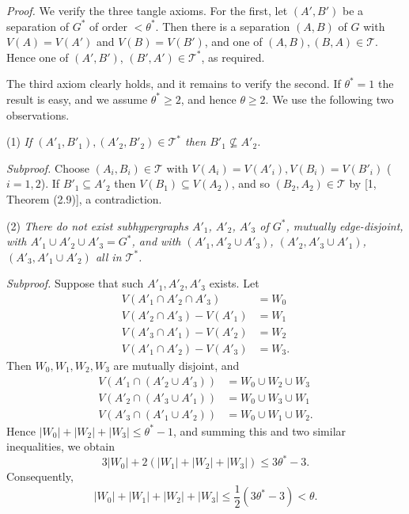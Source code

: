 \textit{Proof.} We verify the three tangle axioms. For the first, let $(A', B')$ be a separation of $G^*$ of order $< \theta^*$. Then there is a separation $(A, B)$ of $G$ with $V(A) = V(A')$ and $V(B) = V(B')$, and one of $(A, B), (B, A) \in \mathscr{T}$. Hence one of $(A', B')$, $(B', A') \in \mathscr{T}^*$, as required.

The third axiom clearly holds, and it remains to verify the second. If $\theta^* = 1$ the result is easy, and we assume $\theta^* \ge 2$, and hence $\theta \ge 2$. We use the following two observations.

\hspace*{12pt}(1) \textit{If $(A'_1, B'_1), (A'_2, B'_2) \in \mathscr{T}^*$ then $B'_1 \not\subseteq A'_2$.}

\textit{Subproof.} Choose $(A_i, B_i) \in \mathscr{T}$ with $V(A_i) = V(A'_i), V(B_i) = V(B'_i)$ ($i = 1, 2$). If $B'_1 \subseteq A'_2$ then $V(B_1) \subseteq V(A_2)$, and so $(B_2, A_2) \in \mathscr{T}$ by [1, Theorem (2.9)], a contradiction.

\hspace*{12pt}(2) \textit{There do not exist subhypergraphs $A'_1$, $A'_2$, $A'_3$ of $G^*$, mutually edge-disjoint, with $A'_1 \cup A'_2 \cup A'_3 = G^*$, and with $(A'_1, A'_2 \cup A'_3)$, $(A'_2, A'_3 \cup A'_1)$, $(A'_3, A'_1 \cup A'_2)$ all in $\mathscr{T}^*$.}

\textit{Subproof.} Suppose that such $A'_1, A'_2, A'_3$ exists. Let
\begin{align*}
V(A'_1 \cap A'_2 \cap A'_3) &= W_0 \\
V(A'_2 \cap A'_3) - V(A'_1) &= W_1 \\
V(A'_3 \cap A'_1) - V(A'_2) &= W_2 \\
V(A'_1 \cap A'_2) - V(A'_3) &= W_3.
\end{align*}
Then $W_0, W_1, W_2, W_3$ are mutually disjoint, and
\begin{align*}
V(A'_1 \cap (A'_2 \cup A'_3)) &= W_0 \cup W_2 \cup W_3 \\
V(A'_2 \cap (A'_3 \cup A'_1)) &= W_0 \cup W_3 \cup W_1 \\
V(A'_3 \cap (A'_1 \cup A'_2)) &= W_0 \cup W_1 \cup W_2.
\end{align*}
Hence $|W_0| + |W_2| + |W_3| \le \theta^* - 1$, and summing this and two similar inequalities, we obtain
\begin{equation*}
3|W_0| + 2(|W_1| + |W_2| + |W_3|) \le 3\theta^* - 3.
\end{equation*}
Consequently,
\begin{equation*}
|W_0| + |W_1| + |W_2| + |W_3| \le \frac{1}{2}(3\theta^* - 3) < \theta.
\end{equation*}
